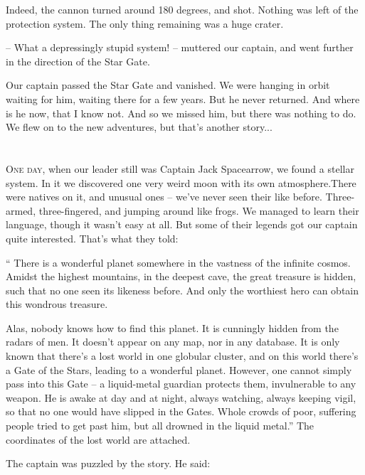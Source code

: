\documentclass[ebook,oneside,final,openright]{memoir}
\begin{document}
\par
Indeed, the cannon turned around 180 degrees, and shot. Nothing was left of the protection system. The only thing remaining was a huge crater.\par
– What a depressingly stupid system! – muttered our captain, and went further in the direction of the Star Gate.\par
\par
Our captain passed the Star Gate and vanished. We were hanging in orbit waiting for him, waiting there for a few years. But he never returned. And where is he now, that I know not. And so we missed him, but there was nothing to do. We flew on to the new adventures, but that’s another story...
\chapter{}
\par
\lettrine{O}{ne day,} when our leader still was Captain Jack Spacearrow, we found a stellar system. In it we discovered one very weird moon with its own atmosphere.There were natives on it, and unusual ones – we’ve never seen their like before. Three-armed, three-fingered, and jumping around like frogs. We managed to learn their language, though it wasn’t easy at all. But some of their legends got our captain quite interested. That’s what they told:\par
\par
“ There is a wonderful planet somewhere in the vastness of the infinite cosmos. Amidst the highest mountains, in the deepest cave, the great treasure is hidden, such that no one seen its likeness before. And only the worthiest hero can obtain this wondrous treasure. \par
Alas, nobody knows how to find this planet. It is cunningly hidden from the radars of men. It doesn’t appear on any map, nor in any database. It is only known that there’s a lost world in one globular cluster, and on this world there’s a Gate of the Stars, leading to a wonderful planet. However, one cannot simply pass into this Gate – a liquid-metal guardian protects them, invulnerable to any weapon. He is awake at day and at night, always watching, always keeping vigil, so that no one would have slipped in the Gates. Whole crowds of poor, suffering people tried to get past him, but all drowned in the liquid metal.” The coordinates of the lost world are attached.\par
\par
The captain was puzzled by the story. He said:\par
\end{document}
